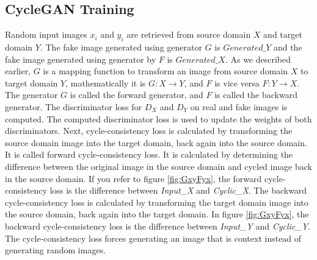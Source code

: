 \subsection{\ac{CycleGAN} Training}





Random input images $x_i$ and $y_i$ are retrieved from source domain $X$ and target domain $Y$. The fake image generated using generator $G$ is $Generated\_Y$ and the fake image generated using generator by $F$ is $Generated\_X$. As we described earlier, $G$ is a mapping function to transform an image from source domain $X$ to target domain $Y$, mathematically it is $G: X \rightarrow Y$, and $F$ is vice versa $F: Y \rightarrow X$. The generator $G$ is called the forward generator, and $F$ is called the backward generator. The discriminator loss for $D_X$ and $D_Y$ on real and fake images is computed. The computed discriminator loss is used to update the weights of both discriminators. Next, cycle-consistency loss is calculated by transforming the source domain image into the target domain, back again into the source domain. It is called forward cycle-consistency loss. It is calculated by determining the difference between the original image in the source domain and cycled image back in the source domain. If you refer to figure \ref{fig:GxyFyx}, the forward cycle-consistency loss is the difference between \textit{Input\_X} and \textit{Cyclic\_X}. The backward cycle-consistency loss is calculated by transforming the target domain image into the source domain, back again into the target domain. In figure \ref{fig:GxyFyx}, the backward cycle-consistency loss is the difference between \textit{Input\_Y} and \textit{Cyclic\_Y}. The cycle-consistency loss forces generating an image that is context instead of generating random images.


